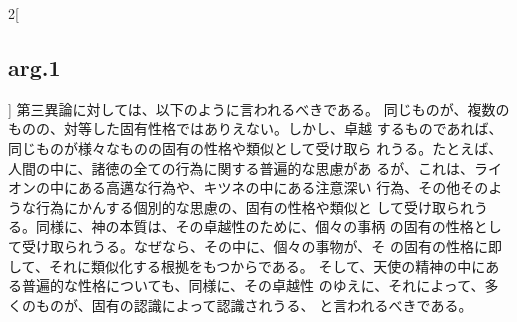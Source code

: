 \documentclass[paper=a4paper,fontsize=10pt,jafontsize=9pt,titlepage]{jlreq}
\begin{document}
\begin{paracol}{2}[\subsection{arg.1}]
第三異論に対しては、以下のように言われるべきである。
 同じものが、複数のものの、対等した固有性格ではありえない。しかし、卓越
 するものであれば、同じものが様々なものの固有の性格や類似として受け取ら
 れうる。たとえば、人間の中に、諸徳の全ての行為に関する普遍的な思慮があ
 るが、これは、ライオンの中にある高邁な行為や、キツネの中にある注意深い
 行為、その他そのような行為にかんする個別的な思慮の、固有の性格や類似と
 して受け取られうる。同様に、神の本質は、その卓越性のために、個々の事柄
 の固有の性格として受け取られうる。なぜなら、その中に、個々の事物が、そ
 の固有の性格に即して、それに類似化する根拠をもつからである。
 そして、天使の精神の中にある普遍的な性格についても、同様に、その卓越性
 のゆえに、それによって、多くのものが、固有の認識によって認識されうる、
 と言われるべきである。

\end{paracol}

\newpage
\end{document}
